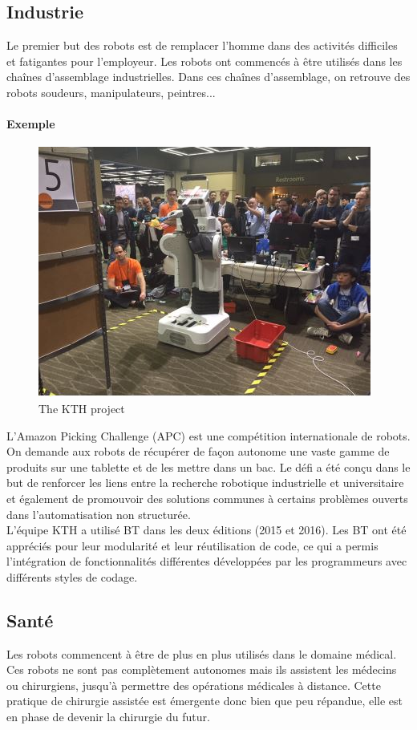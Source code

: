 \documentclass[titlepage]{article}
\begin{document}
		\subsection{Industrie}
		Le premier but des robots est de remplacer l’homme dans des activités difficiles et fatigantes pour l’employeur. Les robots ont commencés à être utilisés dans les chaînes d’assemblage industrielles. Dans ces chaînes d’assemblage, on retrouve des robots soudeurs, manipulateurs, peintres...
		\paragraph{Exemple}
		\begin{figure}[h!]
			\includegraphics[width=\linewidth]{img/robotAma.JPG}
			\caption{The KTH project}
			\label{fig:civil}
		\end{figure}
		L’Amazon Picking Challenge (APC) \cite{apc} est une compétition internationale de robots.
		On demande aux robots de récupérer de façon autonome une vaste gamme de produits sur une tablette et de les mettre dans un bac. Le défi a été conçu dans le but de renforcer les liens entre la recherche robotique industrielle et universitaire et également de promouvoir des solutions communes à certains problèmes ouverts dans l’automatisation non structurée.
		\\
		L'équipe KTH a utilisé BT dans les deux éditions (2015 et
		2016). Les BT ont été appréciés pour leur modularité et leur réutilisation de code, ce qui a permis l’intégration de fonctionnalités différentes développées par les programmeurs avec différents styles de codage.
		\subsection{Santé}
		Les robots commencent à être de plus en plus utilisés dans le domaine médical. Ces robots ne sont pas complètement autonomes mais ils assistent les médecins ou chirurgiens, jusqu'à permettre des opérations médicales à distance.  Cette pratique de chirurgie assistée est émergente donc bien que peu répandue, elle est en phase de devenir la chirurgie du futur.
		
\end{document}
